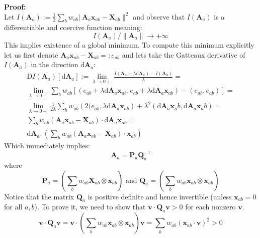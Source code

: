 \documentclass[oneside, a4paper, onecolumn, 11pt]{article}
\renewcommand{\AA}{\mathbf{A}}
\newcommand{\PP}{\mathbf{P}}
\newcommand{\vv}{\mathbf{v}}
\newcommand{\xx}{\mathbf{x}}
\newcommand{\XX}{\mathbf{X}}
\newcommand{\diff}{\mathrm{d}}
\newcommand{\QQ}{\mathbf{Q}}
\begin{document}
\begin{section}
\begin{subsection}
    \textbf{Proof:}\\
    Let $I(\AA_a) :=  \frac{1}{2} \sum_{b} w_{ab} |\ \AA_{a}\xx_{ab} - \XX_{ab}\|^2$ and observe that 
    $I(\AA_a)$ is a differentiable and coercive function meaning: 
    \[
        I(\AA_a)/\|\AA_a\| \rightarrow + \infty
    \]
    This implies existence of a global minimum. %
    To compute this minimum explicitly
    let us first denote $\AA_{a}\xx_{ab} - \XX_{ab} =: e_{ab}$ and lets take the Gatteaux derivative of $I(\AA_a)$ in the direction $\diff \AA_a$:
    \[
        \begin{aligned}
        \text{D}I(\AA_{a})[\diff \AA_a] := \lim_{\lambda \rightarrow 0+} 
        \frac{I(\AA_{a} + \lambda \diff \AA_a) - I(\AA_a)}{\lambda} =\\ 
        \lim_{\lambda \rightarrow 0+} \sum_{b} w_{ab} \left[ 
        \left( e_{ab} + \lambda \diff \AA_a \xx_{ab}, e_{ab} + 
        \lambda \diff \AA_a \xx_{ab} \right) - \left( e_{ab}, e_{ab} \right) \right] = \\
        \lim_{\lambda \rightarrow 0+} \frac{1}{2\lambda} \sum_{b}w_{ab} \left( 2(e_{ab}, \lambda \diff \AA_a \xx_{ab}\right) +
        \lambda^{2} \left( \diff \AA_{a} \xx_ab, \diff \AA_{a} \xx_ab \right)  =\\
        \sum_{b} w_{ab} \left( \AA_{a}\xx_{ab} - \XX_{ab} \right) \cdot \diff \AA_{a} \xx_{ab} = \\
        \diff \AA_{a} : \left( \sum_{b} w_{ab} \left( \AA_{a} \xx_{ab} - \XX_{ab} \right) \cdot \xx_{ab}  \right) 
        \end{aligned}
    \]
    Which immediately implies:
    \begin{equation}
        \AA_a = \PP_a \QQ_a^{-1}
    \end{equation}
    where \begin{equation}
        \PP_a = \left( \sum_b w_{ab} \XX_{ab} \otimes \xx_{ab} \right) \text{ and }
        \QQ_a =  \left( \sum_b w_{ab} \xx_{ab} \otimes \xx_{ab} \right)
    \end{equation}
    Notice that the matrix $\QQ_a$ is positive definite and hence invertible (unless $\xx_{ab} = 0$ for all $a, b$).
    To prove it, we need to show that $\vv \cdot \QQ_{a} \vv > 0 $ for each  nonzero $\vv$.
    \[
        \vv \cdot \QQ_{a} \vv = \vv \cdot  \left( \sum_b w_{ab} \xx_{ab} \otimes \xx_{ab} \right) \vv =
        \sum_{b} w_{ab} (\xx_{ab} \cdot \vv)^2 > 0
    \]
    


\end{subsection}
\end{section}
\end{document}
